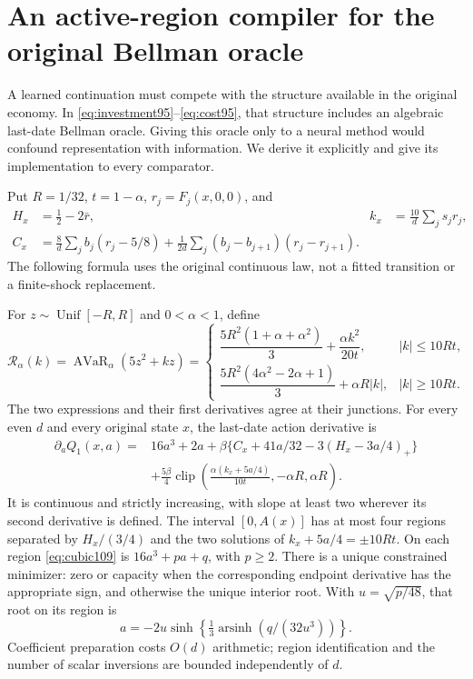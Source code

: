 \section{An active-region compiler for the original Bellman oracle}\label{sec:compiler109}
A learned continuation must compete with the structure available in the original economy. In \eqref{eq:investment95}--\eqref{eq:cost95}, that structure includes an algebraic last-date Bellman oracle. Giving this oracle only to a neural method would confound representation with information. We derive it explicitly and give its implementation to every comparator.

Put $R=1/32$, $t=1-\alpha$, $r_j=F_j(x,0,0)$, and
\begin{align*}
 H_x&=\tfrac12-2\bar r,& k_x&=\frac{10}{d}\sum_js_jr_j,\\
 C_x&=\frac8d\sum_jb_j(r_j-5/8)
 +\frac1{2d}\sum_j(b_j-b_{j+1})(r_j-r_{j+1}).
\end{align*}
The following formula uses the original continuous law, not a fitted transition or a finite-shock replacement.
\begin{theorem}\label{thm:compiler109}
For $z\sim\operatorname{Unif}[-R,R]$ and $0<\alpha<1$, define
\begin{equation}\label{eq:tailpoly109}
 \mathcal R_\alpha(k)=\operatorname{AVaR}_\alpha(5z^2+kz)
 =\begin{cases}
 \dfrac{5R^2(1+\alpha+\alpha^2)}3+\dfrac{\alpha k^2}{20t},& |k|\le10Rt,\\[2mm]
 \dfrac{5R^2(4\alpha^2-2\alpha+1)}3+\alpha R|k|,& |k|\ge10Rt.
 \end{cases}
\end{equation}
The two expressions and their first derivatives agree at their junctions. For every even $d$ and every original state $x$, the last-date action derivative is
\begin{equation}\label{eq:cubic109}
\begin{split}
 \partial_a Q_1(x,a)={}&16a^3+2a+\beta\{C_x+41a/32-3(H_x-3a/4)_+\}\\
 &+\frac{5\beta}{4}\operatorname{clip}\!\left(\frac{\alpha(k_x+5a/4)}{10t},-\alpha R,\alpha R\right).
\end{split}
\end{equation}
It is continuous and strictly increasing, with slope at least two wherever its second derivative is defined. The interval $[0,A(x)]$ has at most four regions separated by
$H_x/(3/4)$ and the two solutions of $k_x+5a/4=\pm10Rt$.
On each region \eqref{eq:cubic109} is $16a^3+pa+q$, with $p\ge2$.
There is a unique constrained minimizer: zero or capacity when the corresponding endpoint derivative has the appropriate sign, and otherwise the unique interior root. With $u=\sqrt{p/48}$, that root on its region is
\[
 a=-2u\sinh\!\left\{\tfrac13\operatorname{arsinh}(q/(32u^3))\right\}.
\]
Coefficient preparation costs $O(d)$ arithmetic; region identification and the number of scalar inversions are bounded independently of $d$.
\end{theorem}

